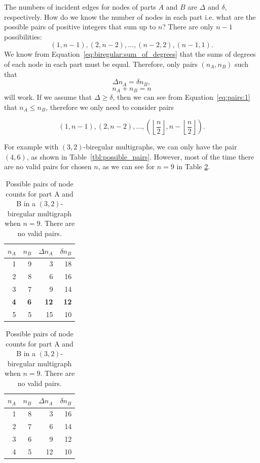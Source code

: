 The numbers of incident edges for nodes of parts $A$ and $B$ are $\Delta$ and $\delta$, respectively.
How do we know the number of nodes in each part i.e. what are the possible pairs of positive integers that sum up to $n$?
There are only $n-1$ possibilities:
$$(1, n-1), (2, n-2), ..., (n-2, 2), (n-1, 1).$$
We know from Equation~\ref{eq:biregular:sum_of_degrees} that the sums of degrees of each node in each part must be equal.
Therefore, only pairs $(n_A, n_B)$ such that
\begin{equation} \label{eq:pairs:1}
  \Delta n_A = \delta n_B,
\end{equation}
\begin{equation} \label{eq:pairs:2}
n_A + n_B = n
\end{equation}
will work.
If we assume that $\Delta \geq \delta$, then we can see from Equation~\ref{eq:pairs:1} that $n_A\leq n_B$, therefore we only need to consider pairs

$$(1, n-1), (2, n-2), ..., (\left\lfloor\frac{n}{2}\right\rfloor, n - \left\lfloor\frac{n}{2}\right\rfloor).$$

For example with $(3,2)$-biregular multigraphs, we can only have the pair $(4, 6)$, as shown in Table~\ref{tbl:possible_pairs}.
However, most of the time there are no valid pairs for chosen $n$, as we can see for $n=9$ in Table \ref{tbl:possible_pairs:no_pairs}.

\begin{table}[H]
  \parbox{.45\linewidth}{
    \centering
    \begin{tabular}{rrrr}
    \toprule
    $n_A$&$n_B$&$\Delta n_A$&$\delta n_B$\\
    \midrule
    1 & 9 & 3  & 18\\
    2 & 8 & 6  & 16\\
    3 & 7 & 9  & 14\\
    \textbf{4} & \textbf{6} & \textbf{12} & \textbf{12}\\
    5 & 5 & 15 & 10\\
    \bottomrule
  \end{tabular}
  \caption{
    Possible pairs of node counts for part A and B in a $(3,2)$-biregular multigraph when $n=10$.
    The only valid pair with $\Delta n_A = \delta n_B$ is (4, 6), and it is bolded.
  }
  \label{tbl:possible_pairs}
  }
  \hfill
  \parbox{.45\linewidth}{
  \centering
  \begin{tabular}{rrrr}
    \toprule
    $n_A$&$n_B$&$\Delta n_A$&$\delta n_B$\\
    \midrule
    1 & 8 & 3  & 16\\
    2 & 7 & 6  & 14\\
    3 & 6 & 9  & 12\\
    4 & 5 & 12 & 10\\
    \bottomrule
  \end{tabular}
  \caption{
    Possible pairs of node counts for part A and B in a $(3,2)$-biregular multigraph when $n=9$.
    There are no valid pairs.
  }
  \label{tbl:possible_pairs:no_pairs}
  }
\end{table}

